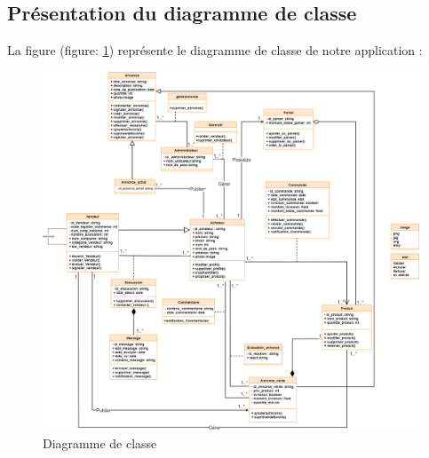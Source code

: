 \documentclass[edit,12pt,a4paper,ChapStyle,oneside,doubleinterligne]{report}
\begin{document}
\subsection{Présentation du diagramme de classe}
La figure (figure: \ref{fig:diag_class}) représente le diagramme de classe de notre application :
\begin{figure}[h!]\label{fig:diag_class}
\centering
\includegraphics[width=1\textwidth]{images/diagramme de class.png}
\caption{Diagramme de classe}
\end{figure}
\end{document}
